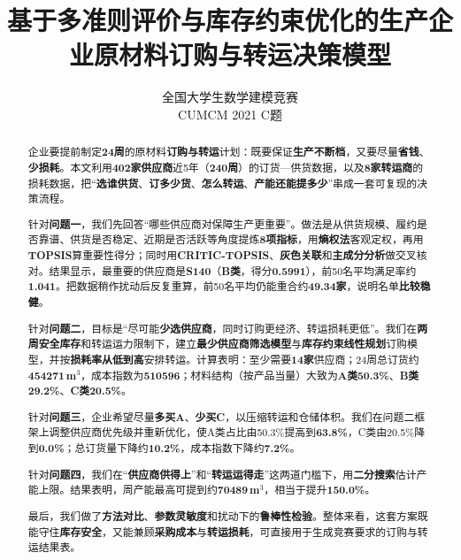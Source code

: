 \documentclass[12pt,a4paper]{ctexart}
\title{\textbf{基于多准则评价与库存约束优化的生产企业原材料订购与转运决策模型}}
\author{全国大学生数学建模竞赛\\CUMCM 2021 C题}
\date{}
\begin{document}
\maketitle

\begin{abstract}
\setlength{\parindent}{2em}
\setlength{\parskip}{0.6em}

企业要提前制定\textbf{24周}的原材料\textbf{订购与转运}计划：既要保证\textbf{生产不断档}，又要尽量\textbf{省钱}、\textbf{少损耗}。本文利用\textbf{402家供应商}近5年（\textbf{240周}）的订货—供货数据，以及\textbf{8家转运商}的损耗数据，把“\textbf{选谁供货}、\textbf{订多少货}、\textbf{怎么转运}、\textbf{产能还能提多少}”串成一套可复现的决策流程。

针对\textbf{问题一}，我们先回答“哪些供应商对保障生产更重要”。做法是从供货规模、履约是否靠谱、供货是否稳定、近期是否活跃等角度提炼\textbf{8项指标}，用\textbf{熵权法}客观定权，再用\textbf{TOPSIS}算重要性得分；同时用\textbf{CRITIC-TOPSIS}、\textbf{灰色关联}和\textbf{主成分分析}做交叉核对。结果显示，最重要的供应商是\textbf{S140}（\textbf{B类}，得分\textbf{0.5991}），前50名平均满足率约\textbf{1.041}。把数据稍作扰动后反复重算，前50名平均仍能重合约\textbf{49.34家}，说明名单\textbf{比较稳健}。

针对\textbf{问题二}，目标是“尽可能\textbf{少选供应商}，同时订购更经济、转运损耗更低”。我们在\textbf{两周安全库存}和转运运力限制下，建立\textbf{最少供应商筛选模型}与\textbf{库存约束线性规划}订购模型，并按\textbf{损耗率从低到高}安排转运。计算表明：至少需要\textbf{14家}供应商；24周总订货约\textbf{454271\,m$^3$}，成本指数为\textbf{510596}；材料结构（按产品当量）大致为\textbf{A类50.3\%}、\textbf{B类29.2\%}、\textbf{C类20.5\%}。

针对\textbf{问题三}，企业希望尽量\textbf{多买A}、\textbf{少买C}，以压缩转运和仓储体积。我们在问题二框架上调整供应商优先级并重新优化，使A类占比由50.3\%提高到\textbf{63.8\%}，C类由20.5\%降到\textbf{0.0\%}；总订货量下降约\textbf{10.2\%}，成本指数下降约\textbf{7.2\%}。

针对\textbf{问题四}，我们在“\textbf{供应商供得上}”和“\textbf{转运运得走}”这两道门槛下，用\textbf{二分搜索}估计产能上限。结果表明，周产能最高可提到约\textbf{70489\,m$^3$}，相当于提升\textbf{150.0\%}。

最后，我们做了\textbf{方法对比}、\textbf{参数灵敏度}和扰动下的\textbf{鲁棒性检验}。整体来看，这套方案既能守住\textbf{库存安全}，又能兼顾\textbf{采购成本}与\textbf{转运损耗}，可直接用于生成竞赛要求的订购与转运结果表。
\end{abstract}
\end{document}
